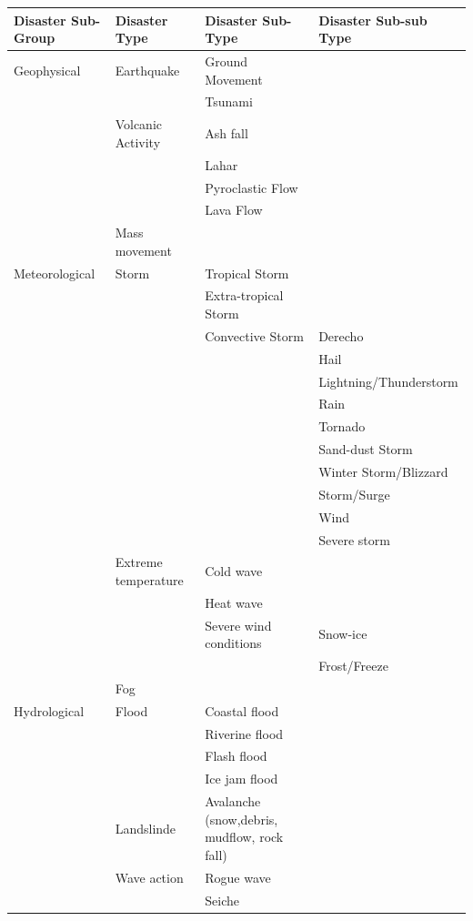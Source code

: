 \documentclass{article}
\begin{document}
\begin{table}[H]
    \centering
    \footnotesize
    \begin{tabular}{p{2.5cm}p{2.5cm}p{2.5cm}p{2.5cm}}
    \toprule 
       Disaster Sub-Group  & Disaster Type & Disaster Sub-Type & Disaster Sub-sub Type  \\
       \midrule
        Geophysical & Earthquake & Ground Movement &\\
        & & Tsunami & \\\cmidrule{2-4}
        & Volcanic Activity & Ash fall& \\
        && Lahar&\\
        && Pyroclastic Flow &\\
        && Lava Flow &\\ \cmidrule{2-4}
        & Mass movement & &\\
    \midrule
    Meteorological & Storm & Tropical Storm &\\
    & & Extra-tropical Storm& \\
    && Convective Storm & Derecho \\
    && & Hail \\
    && & Lightning/Thunderstorm \\
    && & Rain \\
    && & Tornado \\
    && & Sand-dust Storm \\
    && & Winter Storm/Blizzard \\
    && & Storm/Surge \\
    && & Wind \\
    && & Severe storm \\ \cmidrule{2-4}
    & Extreme temperature & Cold wave &\\
    && Heat wave & \\
    && Severe wind conditions & Snow-ice \\
    &&& Frost/Freeze\\ \cmidrule{2-4}
    & Fog && \\
    \midrule
    Hydrological&Flood&Coastal flood&\\
    &&Riverine flood&\\
    &&Flash flood&\\
    &&Ice jam flood&\\ \cmidrule{2-4}
    & Landslinde & Avalanche (snow,debris, mudflow, rock fall) &\\
    \cmidrule{2-4}
    & Wave action & Rogue wave &\\
    && Seiche &\\ 

\end{tabular}
\end{table}
\end{document}
